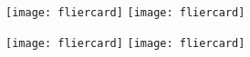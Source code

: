 \documentclass{article}
\begin{document}
\pagestyle{plain}

\begin{Row}
    \begin{Cell}{1}
        \centering
        \texttt{[image: fliercard]}
        \hspace{0.125in}
        \texttt{[image: fliercard]}
    \end{Cell}
\end{Row}

\vfill

\begin{Row}
    \begin{Cell}{1}
        \centering
        \texttt{[image: fliercard]}
        \hspace{0.125in}
        \texttt{[image: fliercard]}
    \end{Cell}
\end{Row}
\end{document}
